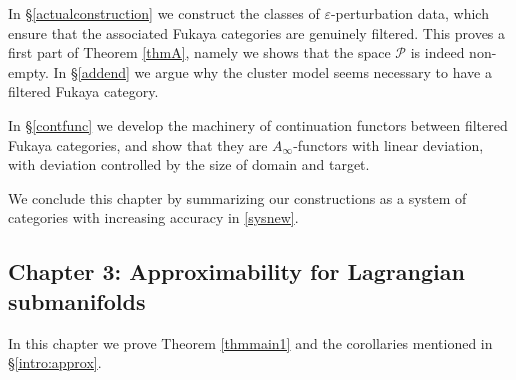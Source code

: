 In \S \ref{actualconstruction} we construct the classes of $\varepsilon$-perturbation data, which ensure that the associated Fukaya categories are genuinely filtered. This proves a first part of Theorem \ref{thmA}, namely we shows that the space $\mathcal{P}$ is indeed non-empty. In \S \ref{addend} we argue why the cluster model seems necessary to have a filtered Fukaya category. 
 
In \S \ref{contfunc} we develop the machinery of continuation functors between filtered Fukaya categories, and show that they are $A_\infty$-functors with linear deviation, with deviation controlled by the size of domain and target.

We conclude this chapter by summarizing our constructions as a system of categories with increasing accuracy in \ref{sysnew}.

 \subsection*{Chapter 3: Approximability for Lagrangian submanifolds}
In this chapter we prove Theorem \ref{thmmain1} and the corollaries mentioned in \S\ref{intro:approx}.


